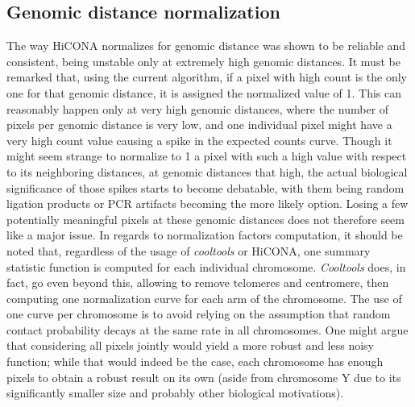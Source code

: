 \subsection{Genomic distance normalization}
The way HiCONA normalizes for genomic distance was shown to be reliable and consistent, being unstable only at extremely high genomic distances. It must be remarked that, using the current algorithm, if a pixel with high count is the only one for that genomic distance, it is assigned the normalized value of 1. This can reasonably happen only at very high genomic distances, where the number of pixels per genomic distance is very low, and one individual pixel might have a very high count value causing a spike in the expected counts curve. Though it might seem strange to normalize to 1 a pixel with such a high value with respect to its neighboring distances, at genomic distances that high, the actual biological significance of those spikes starts to become debatable, with them being random ligation products or PCR artifacts becoming the more likely option. Losing a few potentially meaningful pixels at these genomic distances does not therefore seem like a major issue. In regards to normalization factors computation, it should be noted that, regardless of the usage of \textit{cooltools} or HiCONA, one summary statistic function is computed for each individual chromosome. \textit{Cooltools} does, in fact, go even beyond this, allowing to remove telomeres and centromere, then computing one normalization curve for each arm of the chromosome. The use of one curve per chromosome is to avoid relying on the assumption that random contact probability decays at the same rate in all chromosomes. One might argue that considering all pixels jointly would yield a more robust and less noisy function; while that would indeed be the case, each chromosome has enough pixels to obtain a robust result on its own (aside from chromosome Y due to its significantly smaller size and probably other biological motivations).

